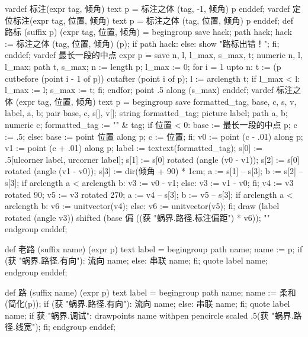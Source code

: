 \startMPinclusions[+]
vardef 标注(expr tag, 倾角) text p =
  标注之体 (tag, -1, 倾角) p
enddef;
vardef 定位标注(expr tag, 位置, 倾角) text p =
  标注之体 (tag, 位置, 倾角) p
enddef;
def 路标 (suffix p) (expr tag, 位置, 倾角) =
  begingroup
    save hack; path hack;
    hack := 标注之体 (tag, 位置, 倾角) (p);
    if path hack:
    else:
      show "路标出错！";
    fi;
enddef;
vardef 最长一段的中点 expr p =
  save n, l, l_max, s_max, t;
  numeric n, l, l_max; path t, s_max;
  n := length p;
  l_max := 0;
  for i = 1 upto n:
    t := (p cutbefore (point i - 1 of p)) cutafter (point i of p);
    l := arclength t;
    if l_max < l:
      l_max := l; s_max := t;
    fi;
  endfor;
  point .5 along (s_max)
enddef;
vardef 标注之体 (expr tag, 位置, 倾角) text p =
  begingroup
    save formatted_tag, base, c, s, v, label, a, b;
    pair base, c, s[], v[]; string formatted_tag; picture label; path a, b; numeric c;
    formatted_tag := "\tfx" & tag;
    if 位置 < 0:
      base := 最长一段的中点 p;
      c := .5;
    else:
      base := point 位置 along p;
      c := 位置;
    fi;
    v0 := point (c - .01) along p;
    v1 := point (c + .01) along p;
    label := textext(formatted_tag);
    s[0] := .5[ulcorner label, urcorner label];
    s[1] := s[0] rotated (angle (v0 - v1));
    s[2] := s[0] rotated (angle (v1 - v0));
    s[3] := dir(倾角 + 90) * 1cm; %
    a := s[1] -- s[3];
    b := s[2] -- s[3];
    if arclength a < arclength b:
      v3 := v0 - v1;
    else:
      v3 := v1 - v0;
    fi;
    v4 := v3 rotated 90;
    v5 := v3 rotated 270;
    a := v4 -- s[3];
    b := v5 -- s[3];
    if arclength a < arclength b:
      v6 := unitvector(v4);
    else:
      v6 := unitvector(v5);
    fi;
    draw (label rotated (angle v3)) shifted (base 偏 ((获 "蜗界.路径.标注偏距") * v6));
    ""
  endgroup
enddef;
\stopMPinclusions

\startMPinclusions[+]
def 老路 (suffix name) (expr p) text label =
  begingroup
  path name; name := p;
  if (获 "蜗界.路径.有向"):
    流向 name;
  else:
    串联 name;
  fi;
  quote label name;
  endgroup
enddef;

def 路 (suffix name) (expr p) text label =
  begingroup
  path name; name := 柔和(简化(p));
  if (获 "蜗界.路径.有向"):
    流向 name;
  else:
    串联 name;
  fi;
  quote label name;
  if 获 "蜗界.调试": 
    drawpoints name 
      withpen pencircle scaled .5(获 "蜗界.路径.线宽"); 
  fi;
  endgroup
enddef;
\stopMPinclusions

